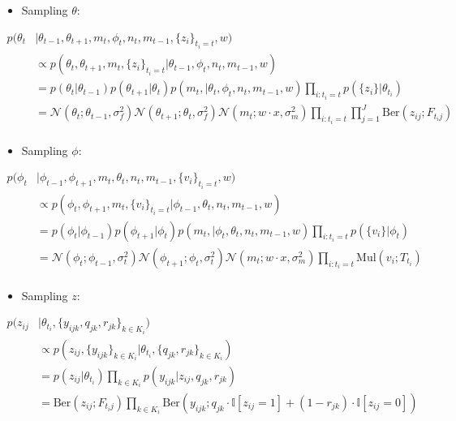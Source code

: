 \documentclass[11pt]{article}
\theoremstyle{plain}
\theoremstyle{definition}
\begin{document}
\begin{itemize}
\item Sampling $\theta$:
\end{itemize}
\begin{align*}
p(\theta_t &| \theta_{t-1}, \theta_{t+1}, m_t, \phi_t, n_t, m_{t-1}, \{z_i\}_{t_i=t}, w) \\
&\propto p(\theta_t, \theta_{t+1}, m_t, \{z_i\}_{t_i=t}| \theta_{t-1}, \phi_t, n_t, m_{t-1}, w) \\
&= p(\theta_t | \theta_{t-1}) p(\theta_{t+1}|\theta_t) p(m_t, | \theta_t, \phi_t, n_t, m_{t-1}, w) \prod_{i : t_i = t} p(\{z_i\} | \theta_{t_i})  \\
&= \mathcal{N}(\theta_t ; \theta_{t-1}, \sigma_f^2)  \mathcal{N}(\theta_{t+1} ; \theta_{t}, \sigma_f^2) \mathcal{N}(m_t ; w \cdot x, \sigma_m^2) \prod_{i : t_i = t} \prod_{j=1}^J \textrm{Ber}(z_{ij} ; F_{t_i j} )  \\
\end{align*}

\begin{itemize}
\item Sampling $\phi$:
\end{itemize}
\begin{align*}
p(\phi_t &| \phi_{t-1}, \phi_{t+1}, m_t, \theta_t, n_t, m_{t-1}, \{v_i\}_{t_i=t}, w) \\
&\propto p(\phi_t, \phi_{t+1}, m_t, \{v_i\}_{t_i=t}| \phi_{t-1}, \theta_t, n_t, m_{t-1}, w) \\
&= p(\phi_t | \phi_{t-1}) p(\phi_{t+1}|\phi_t) p(m_t, | \phi_t, \theta_t, n_t, m_{t-1}, w) \prod_{i : t_i = t} p(\{v_i\} | \phi_{t})  \\
&= \mathcal{N}(\phi_t ; \phi_{t-1}, \sigma_t^2)  \mathcal{N}(\phi_{t+1} ; \phi_{t}, \sigma_t^2) \mathcal{N}(m_t ; w \cdot x, \sigma_m^2) \prod_{i : t_i = t} \textrm{Mul}(v_i ; T_{t_i} )  \\
\end{align*}

\begin{itemize}
\item Sampling $z$:
\end{itemize}
\begin{align*}
p(z_{ij} &| \theta_{t_i}, \{y_{ijk}, q_{jk}, r_{jk}\}_{k \in K_i}) \\
&\propto p(z_{ij}, \{y_{ijk}\}_{k \in K_i} | \theta_{t_i}, \{q_{jk}, r_{jk}\}_{k \in K_i}) \\
&= p(z_{ij} | \theta_{t_i}) \prod_{k \in K_i} p(y_{ijk} | z_{ij}, q_{jk}, r_{jk}) \\
&= \textrm{Ber}(z_{ij} ; F_{t_i j} ) \prod_{k \in K_i} \textrm{Ber}(y_{ijk} ; q_{jk} \cdot \mathbb{I}[z_{ij}=1] + (1-r_{jk}) \cdot \mathbb{I}[z_{ij}=0])\\
\end{align*}
\end{document}
